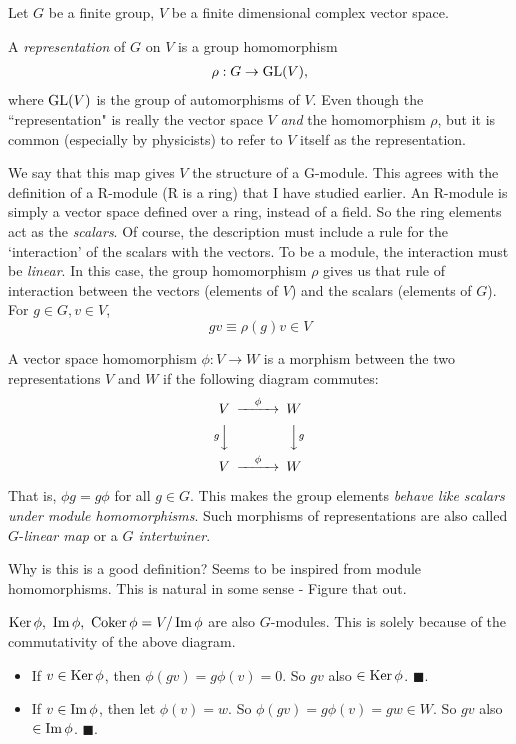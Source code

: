 Let $G$ be a finite group, $V$ be a finite dimensional complex vector space.

A \emph{representation} of $G$ on $V$ is a group homomorphism 
\begin{align}
    \rho:  G\to \operatorname{GL}(V), 
\end{align}
where $\operatorname{GL}(V)$ is the group of automorphisms of $V$. Even though the ``representation" is really the vector space $V$ \emph{and} the homomorphism $\rho$, but it is common (especially by physicists) to refer to $V$ itself as the representation. 

\begin{insight}
We say that this map gives $V$ the structure of a G-module. This agrees with the  definition of a R-module (R is a ring) that I have studied earlier. An R-module is simply a vector space defined over a ring, instead of a field. So the ring elements act as the \emph{scalars}. Of course, the description must include a rule for the `interaction' of the scalars with the vectors. To be a module, the interaction must be \emph{linear}.  
In this case, the group homomorphism $\rho$ gives us that rule of interaction between the vectors (elements of $V$) and the scalars (elements of $G$). For $g\in G, v \in V$, $$gv\equiv\rho(g)v \in V$$
\end{insight}


A vector space homomorphism $\phi: V\to W$ is a morphism between the two representations $V$ and $W$ if the following diagram commutes:
\begin{equation} \begin{CD}
  V @>\phi>> W\\
  @VgVV @VVgV\\
  V @>\phi>> W\\
\end{CD} \end{equation}

That is, $\phi g=g\phi$ for all $g\in G$. This makes the group elements \emph{behave like scalars under module homomorphisms}. Such morphisms of representations are also called $G$-\emph{linear map} or a \emph{$G$ intertwiner}.

\begin{insight}
   Why is this is a good definition? Seems to be inspired from module homomorphisms. This is natural in some sense - Figure that out.
\end{insight}

$\operatorname{Ker} \phi,\ \operatorname{Im} \phi,\ \operatorname{Coker} \phi = V/\operatorname{Im}\phi$ are also $G$-modules. This is solely because of the commutativity of the above diagram.
\begin{itemize}
    \item If $v\in \operatorname{Ker} \phi$, then $\phi(gv) = g\phi(v) = 0$. So $gv$ also $\in \operatorname{Ker} \phi$. $\blacksquare$.
    \item If $v\in \operatorname{Im} \phi$, then let $\phi(v) = w$. So $\phi(gv)=g\phi(v)=gw \in W$. So $gv$ also $\in \operatorname{Im} \phi$. $\blacksquare$.
\end{itemize}

